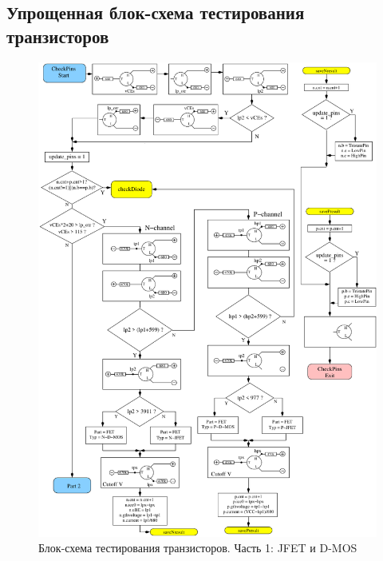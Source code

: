\subsection{Упрощенная блок-схема тестирования транзисторов}

\begin{figure}[H]
\centering
\includegraphics[width=.95\textwidth]{../FIG/CheckSemi1.pdf}
\caption{Блок-схема тестирования транзисторов. Часть 1: JFET и D-MOS}
\label{fig:ChkSemi1}
\end{figure}

